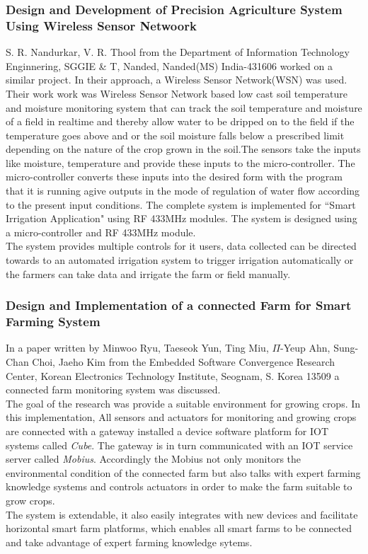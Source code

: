 \documentclass[12pt, a4paper]{article}
\begin{document}
\subsubsection{Design and Development of Precision Agriculture System Using Wireless Sensor Netwoork}
S. R. Nandurkar, V. R. Thool from the Department of Information Technology Enginnering, SGGIE \& T, Nanded, Nanded(MS) India-431606 worked on a similar project. In their approach, a Wireless Sensor Network(WSN) was used.\\
Their work work was Wireless Sensor Network based low cast soil temperature and moisture monitoring system that can track the soil temperature and moisture of a field in realtime and thereby allow water to be dripped on to the field if the temperature goes above and or the soil moisture falls below a prescribed limit depending on the nature of the crop grown in the soil.The sensors take the inputs like moisture, temperature and provide these inputs to the micro-controller. The micro-controller converts these inputs into the desired form with the program that it is running agive outputs in the mode of regulation of water flow according to the present input conditions. The complete system is implemented for ``Smart Irrigation Application" using RF 433MHz modules. The system is designed using a micro-controller and RF 433MHz module.\\ The system provides multiple controls for it users, data collected can be directed towards to an automated irrigation system to trigger irrigation automatically or the farmers can take data and irrigate the farm or field manually.  

\subsubsection{Design and Implementation of a connected Farm for Smart Farming System}
In a paper written by Minwoo Ryu, Taeseok Yun, Ting Miu, $\Pi$-Yeup Ahn, Sung-Chan Choi, Jaeho Kim from the Embedded Software Convergence Research Center, Korean Electronics Technology Institute, Seognam, S. Korea 13509 a connected farm monitoring system was discussed.\\
The goal of the research was provide a suitable environment for growing crops. In this implementation, All sensors and actuators for monitoring and growing crops are connected with a gateway installed a device software platform for IOT systems called \emph{Cube}. The gateway is in turn communicated with an IOT service server called \emph{Mobius}. Accordingly the Mobius not only monitors the environmental condition of the connected farm but also talks with expert farming knowledge systems and controls actuators in order to make the farm suitable to grow crops.\\
The system is extendable, it also easily integrates with new devices and facilitate horizontal smart farm platforms, which enables all smart farms to be connected and take advantage of expert farming knowledge sytems.    
  
\end{document}
